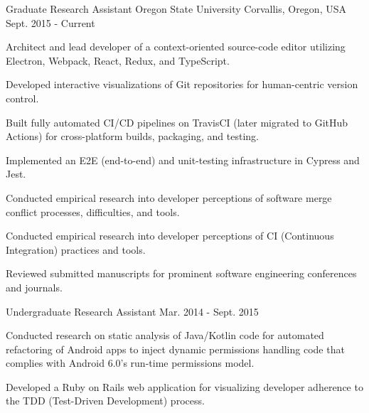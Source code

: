 

\begin{cventries}

  \cventry
    {Graduate Research Assistant} %
    {Oregon State University} %
    {Corvallis, Oregon, USA} %
    {Sept. 2015 - Current} %
    {
      \begin{cvitems} %
        \item {Architect and lead developer of a context-oriented source-code editor utilizing Electron, Webpack, React, Redux, and TypeScript.}
        \item {Developed interactive visualizations of Git repositories for human-centric version control.}
        \item {Built fully automated CI/CD pipelines on TravisCI (later migrated to GitHub Actions) for cross-platform builds, packaging, and testing.}
        \item {Implemented an E2E (end-to-end) and unit-testing infrastructure in Cypress and Jest.}
        \item {Conducted empirical research into developer perceptions of software merge conflict processes, difficulties, and tools.}
        \item {Conducted empirical research into developer perceptions of CI (Continuous Integration) practices and tools.}
        \item {Reviewed submitted manuscripts for prominent software engineering conferences and journals.}
      \end{cvitems}
    }

  \cventry
    {Undergraduate Research Assistant} %
    {} %
    {} %
    {Mar. 2014 - Sept. 2015} %
    {
      \begin{cvitems} %
        \item {Conducted research on static analysis of Java/Kotlin code for automated refactoring of Android apps to inject dynamic permissions handling code that complies with Android 6.0's run-time permissions model.}
        \item {Developed a Ruby on Rails web application for visualizing developer adherence to the TDD (Test-Driven Development) process.}
      \end{cvitems}
    }


\end{cventries}
